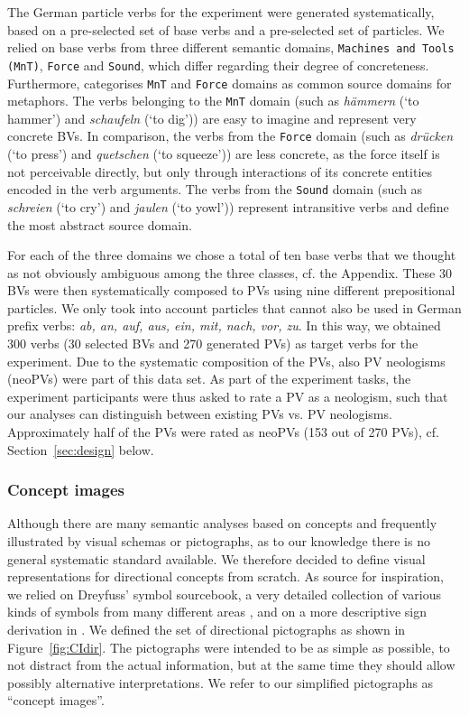\documentclass[output=paper]{langsci/langscibook}
\begin{document}
The German particle verbs for the experiment were generated
systematically, based on a pre-selected set of base verbs and a
pre-selected set of particles. We relied on base verbs from three
different semantic domains, \texttt{Machines and Tools (MnT)},
\texttt{Force} and \texttt{Sound}, which differ regarding their degree
of concreteness. Furthermore, \cite{Koevecses:02} categorises
\texttt{MnT} and \texttt{Force} domains as common source domains for
metaphors. The verbs belonging to the \texttt{MnT} domain (such as
\textit{hämmern} (`to hammer') and \textit{schaufeln} (`to dig')) are
easy to imagine and represent very concrete BVs. In comparison, the
verbs from the \texttt{Force} domain (such as \textit{drücken} (`to
press') and \textit{quetschen} (`to squeeze')) are less concrete, as
the force itself is not perceivable directly, but only through
interactions of its concrete entities encoded in the verb
arguments. The verbs from the \texttt{Sound} domain (such as
\textit{schreien} (`to cry') and \textit{jaulen} (`to yowl'))
represent intransitive verbs and define the most abstract source
domain.

For each of the three domains we chose a total of ten base verbs that
we thought as not obviously ambiguous among the three classes, cf. the
Appendix. These 30 BVs were then systematically composed to PVs using
nine different prepositional particles. We only took into account
particles that cannot also be used in German prefix verbs: \textit{ab,
  an, auf, aus, ein, mit, nach, vor, zu}. In this way, we obtained 300
verbs (30 selected BVs and 270 generated PVs) as target verbs for the
experiment. Due to the systematic composition of the PVs, also PV
neologisms (neoPVs) were part of this data set. As part of the
experiment tasks, the experiment participants were thus asked to rate
a PV as a neologism, such that our analyses can distinguish between
existing PVs vs. PV neologisms. Approximately half of the PVs were
rated as neoPVs (153 out of 270 PVs), cf. Section~\ref{sec:design}
below.


\subsubsection{Concept images}
\label{sec:image-schema}

Although there are many semantic analyses based on concepts and
frequently illustrated by visual schemas or pictographs, as to our
knowledge there is no general systematic standard available. We
therefore decided to define visual representations for directional
concepts from scratch. As source for inspiration, we relied on
Dreyfuss' symbol sourcebook, a very detailed collection of various
kinds of symbols from many different areas \citep{Dreyfuss:84}, and on
a more descriptive sign derivation in \cite{Frutiger:87}. We defined
the set of directional pictographs as shown in
Figure~\ref{fig:CIdir}. The pictographs were intended to be as simple
as possible, to not distract from the actual information, but at the
same time they should allow possibly alternative interpretations. We
refer to our simplified pictographs as ``concept images''.
\end{document}
